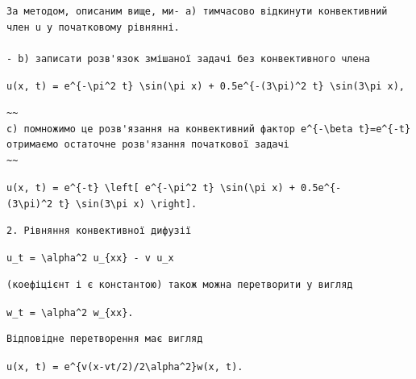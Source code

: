 \documentclass[
  ukrainian,
]{article}
\begin{document}
\begin{verbatim}
За методом, описаним вище, ми- a) тимчасово відкинути конвективний член u у початковому рівнянні.

- b) записати розв'язок змішаної задачі без конвективного члена
\end{verbatim}

\texttt{u(x,\ t)\ =\ e\^{}\{-\textbackslash{}pi\^{}2\ t\}\ \textbackslash{}sin(\textbackslash{}pi\ x)\ +\ 0.5e\^{}\{-(3\textbackslash{}pi)\^{}2\ t\}\ \textbackslash{}sin(3\textbackslash{}pi\ x),}

\begin{verbatim}
~~
c) помножимо це розв'язання на конвективний фактор e^{-\beta t}=e^{-t} отримаємо остаточне розв'язання початкової задачі
~~
\end{verbatim}

\texttt{u(x,\ t)\ =\ e\^{}\{-t\}\ \textbackslash{}left{[}\ e\^{}\{-\textbackslash{}pi\^{}2\ t\}\ \textbackslash{}sin(\textbackslash{}pi\ x)\ +\ 0.5e\^{}\{-(3\textbackslash{}pi)\^{}2\ t\}\ \textbackslash{}sin(3\textbackslash{}pi\ x)\ \textbackslash{}right{]}.}

\begin{verbatim}
2. Рівняння конвективної дифузії
\end{verbatim}

\texttt{u\_t\ =\ \textbackslash{}alpha\^{}2\ u\_\{xx\}\ -\ v\ u\_x}

\begin{verbatim}
(коефіцієнт і є константою) також можна перетворити у вигляд
\end{verbatim}

\texttt{w\_t\ =\ \textbackslash{}alpha\^{}2\ w\_\{xx\}.}

\begin{verbatim}
Відповідне перетворення має вигляд
\end{verbatim}

\texttt{u(x,\ t)\ =\ e\^{}\{v(x-vt/2)/2\textbackslash{}alpha\^{}2\}w(x,\ t).}
\end{document}
